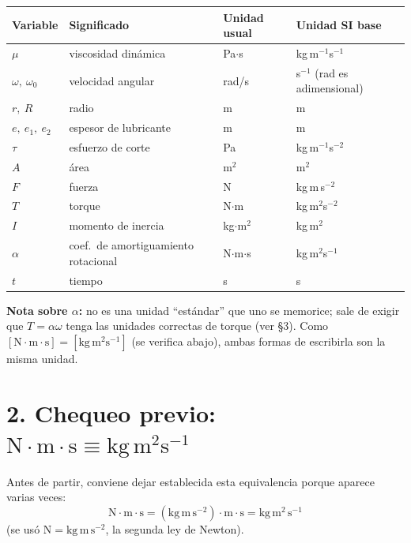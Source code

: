 \documentclass[11pt]{article}
\begin{document}
\begin{center}
\begin{tabular}{@{}llll@{}}
\toprule
Variable & Significado & Unidad usual & Unidad SI base \\
\midrule
$\mu$ & viscosidad din\'amica & Pa$\cdot$s & kg$\,$m$^{-1}$s$^{-1}$ \\
$\omega,\ \omega_0$ & velocidad angular & rad/s & s$^{-1}$ (rad es adimensional) \\
$r,\ R$ & radio & m & m \\
$e,\ e_1,\ e_2$ & espesor de lubricante & m & m \\
$\tau$ & esfuerzo de corte & Pa & kg$\,$m$^{-1}$s$^{-2}$ \\
$A$ & \'area & m$^2$ & m$^2$ \\
$F$ & fuerza & N & kg$\,$m$\,$s$^{-2}$ \\
$T$ & torque & N$\cdot$m & kg$\,$m$^2$s$^{-2}$ \\
$I$ & momento de inercia & kg$\cdot$m$^2$ & kg$\,$m$^2$ \\
$\alpha$ & coef.\ de amortiguamiento rotacional & N$\cdot$m$\cdot$s & kg$\,$m$^2$s$^{-1}$ \\
$t$ & tiempo & s & s \\
\bottomrule
\end{tabular}
\end{center}

\textbf{Nota sobre $\alpha$:} no es una unidad ``est\'andar'' que uno se memorice; sale
de exigir que $T=\alpha\omega$ tenga las unidades correctas de torque (ver \S3). Como
$[\text{N}\!\cdot\!\text{m}\!\cdot\!\text{s}] = [\text{kg}\,\text{m}^2\text{s}^{-1}]$
(se verifica abajo), ambas formas de escribirla son la misma unidad.

\section*{2. Chequeo previo: $\text{N}\cdot\text{m}\cdot\text{s} \equiv \text{kg}\,\text{m}^2\text{s}^{-1}$}

Antes de partir, conviene dejar establecida esta equivalencia porque aparece varias
veces:
\begin{equation}
\text{N}\cdot\text{m}\cdot\text{s} = \left(\text{kg}\,\text{m}\,\text{s}^{-2}\right)\cdot
\text{m}\cdot\text{s} = \text{kg}\,\text{m}^2\,\text{s}^{-1}
\end{equation}
(se us\'o $\text{N}=\text{kg}\,\text{m}\,\text{s}^{-2}$, la segunda ley de Newton).
\end{document}
